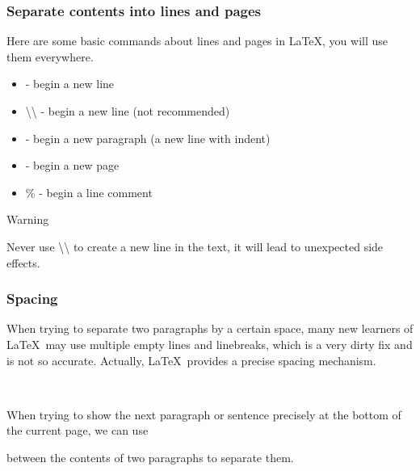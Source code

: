 \begin{frame}
    \frametitle{Separate contents into lines and pages}
    Here are some basic commands about lines and pages in \LaTeX,  you will use them everywhere.
    \begin{itemize}
        \item {} - begin a new line
        \item \alert{\textbackslash\textbackslash} - begin a new line (not recommended\footnotemark[1])
        \item {} - begin a new paragraph (a new line with indent)
        \item {} - begin a new page
        \item \alert{\%} - begin a line comment
    \end{itemize}
\end{frame}

\begin{frame}{Warning}
    \begin{warning}
        Never use \alert{\textbackslash\textbackslash} to create a new line in the text, it will lead to unexpected side effects.
    \end{warning}
  \end{frame}

\begin{frame}[fragile]
    \frametitle{Spacing}
    When trying to separate two paragraphs by a certain space, many new learners of \LaTeX\ may use multiple empty lines and linebreaks, which is a very dirty fix and is not so accurate. Actually, \LaTeX\ provides a precise spacing mechanism.
    \begin{command}
        \LC{\vspace{space}}\\
        \LC{\vspace*{space}}
    \end{command}
    When trying to show the next paragraph or sentence precisely at the bottom of the current page, we can use
    \begin{command}
        \LC{\vfill}
    \end{command}
    between the contents of two paragraphs to separate them.
\end{frame}

